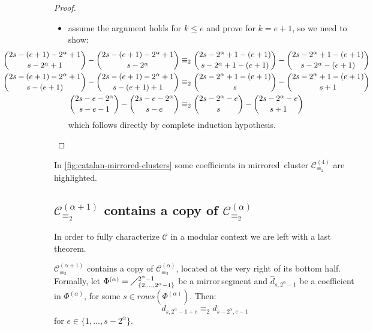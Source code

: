 \begin{proof}
\begin{itemize}
        \item assume the argument holds for $k\leq e$ and prove for $k=e+1$, so we need to show:
            \begin{displaymath}
                \hspace{-3cm}
                \begin{split}
                    {{2s-(e+1)-2^{{\alpha}}+1}\choose{s-2^{{\alpha}}+1}}
                        - {{2s-(e+1)-2^{{\alpha}}+1}\choose{s-2^{{\alpha}}}}
                    &\equiv_{2}
                    {{2s-2^{{\alpha}}+1-(e+1)}\choose{s-2^{{\alpha}}+1-(e+1)}}
                        - {{2s-2^{{\alpha}}+1-(e+1)}\choose{s-2^{{\alpha}}-(e+1)}}\\
                    {{2s-(e+1)-2^{{\alpha}}+1}\choose{s-(e+1)}}
                        - {{2s-(e+1)-2^{{\alpha}}+1}\choose{s-(e+1)+1}}
                    &\equiv_{2}
                    {{2s-2^{{\alpha}}+1-(e+1)}\choose{s}}
                        - {{2s-2^{{\alpha}}+1-(e+1)}\choose{s+1}}\\
                    {{2s-e-2^{{\alpha}}}\choose{s-e-1}}
                        - {{2s-e-2^{{\alpha}}}\choose{s-e}}
                    &\equiv_{2}
                    {{2s-2^{{\alpha}}-e}\choose{s}}
                        - {{2s-2^{{\alpha}}-e}\choose{s+1}}\\
                \end{split}
            \end{displaymath}
            which follows directly by complete induction hypothesis.
\end{itemize}

\end{proof}


In \autoref{fig:catalan-mirrored-clusters} some coefficients in \flqq mirrored\frqq\,
cluster $\mathcal{C}_{\equiv_{2}}^{(4)}$ are highlighted.

\subsection{$\mathcal{C}_{\equiv_{2}}^{(\alpha+1)}$ 
    contains a copy of $\mathcal{C}_{\equiv_{2}}^{(\alpha)}$}

In order to fully characterize $\mathcal{C}$ in a modular context we are
left with a last theorem.

\begin{theorem}
    $\mathcal{C}_{\equiv_{2}}^{(\alpha+1)}$ 
    contains a copy of $\mathcal{C}_{\equiv_{2}}^{(\alpha)}$,
    located at the very right of its bottom half. Formally, 
    let $\Phi^{(\alpha)}=\diagup_{\lbrace 2,\ldots,2^{\alpha}-1\rbrace}^{2^{\alpha}-1}$
    be a \flqq mirror\frqq\,segment and $\hat{d}_{s,2^{{\alpha}}-1}$ 
    be a coefficient in $\Phi^{(\alpha)}$, for some $s\in rows\left(\Phi^{(\alpha)}\right)$. Then:
    \begin{displaymath}
        d_{s,2^{{\alpha}}-1+e} \equiv_{2} d_{s-2^{{\alpha}},e-1}
    \end{displaymath}
    for $e\in\lbrace1,\ldots,s-2^{{\alpha}}\rbrace$.
    \label{thm:principal:cluster:copy:containment}
\end{theorem}

